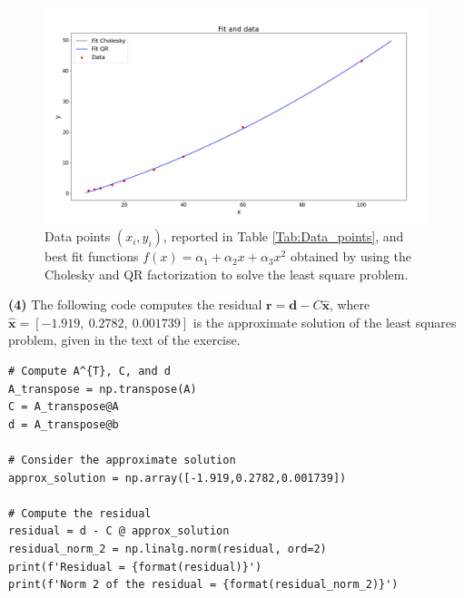 \documentclass[a4paper,11pt]{article}
\begin{document}
\begin{figure}[H]
	\centering
	\includegraphics[scale=0.32]{../Project_2_latex/Plot/Fit_and_data.png}
	\caption{Data points $(x_{i},y_{i})$, reported in Table \ref{Tab:Data_points}, and best fit functions $f(x) = \alpha_{1} + \alpha_{2}x + \alpha_{3}x^{2}$ obtained by using the Cholesky and QR factorization to solve the least square problem.}
	\label{fig: fit and data Cholesky QR}
\end{figure}



\noindent \textbf{(4)} The following code computes the residual $\textbf{r} = \textbf{d} - C\hat{\textbf{x}}$, where $\hat{\textbf{x}} =  \left[  - 1.919,\  0.2782,\  0.001739\right] $ is the approximate solution of the least squares problem, given in the text of the exercise.

\begin{verbatim}
# Compute A^{T}, C, and d
A_transpose = np.transpose(A)
C = A_transpose@A
d = A_transpose@b

# Consider the approximate solution
approx_solution = np.array([-1.919,0.2782,0.001739])

# Compute the residual
residual = d - C @ approx_solution
residual_norm_2 = np.linalg.norm(residual, ord=2)
print(f'Residual = {format(residual)}')
print(f'Norm 2 of the residual = {format(residual_norm_2)}')
\end{verbatim}
\end{document}
